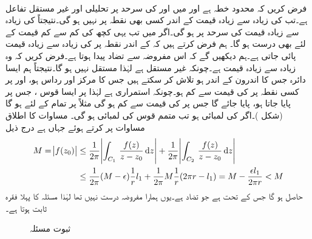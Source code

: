 \quad {}\\
فرض کریں کہ  محدود خطہ ہے اور  میں اور  کی سرحد  پر  تحلیلی اور غیر مستقل  تفاعل ہے۔تب   کی زیادہ سے زیادہ قیمت  کے اندر کسی بھی نقطہ پر نہیں ہو گی۔نتیجتاً  کی زیادہ سے زیادہ قیمت  کی سرحد پر ہو گی۔اگر  میں  تب یہی کچھ  کی کم سے کم قیمت کے لئے بھی درست ہو گا۔
\quad
ہم فرض کرتے ہیں کہ  کے اندر نقطہ  پر  کی زیادہ سے زیادہ قیمت پائی جاتی ہے۔ہم دیکھیں گے کہ اس مفروضہ سے تضاد پیدا ہوتا ہے۔فرض کریں کہ وہ زیادہ سے زیادہ قیمت  ہے۔چونکہ  غیر مستقل ہے لہٰذا  مستقل نہیں ہو گا۔نتیجتاً ہم  ایسا دائرہ  جس کا اندرون  کے اندر  ہو تلاش کر سکتے ہیں جس کا مرکز  اور رداس  ہو، اور  پر کسی نقطہ  پر  کی قیمت  سے کم ہو۔چونکہ  استمراری ہے لہٰذا   پر ایسا قوس ، جس پر  پایا جاتا ہو، پایا جائے گا جس پر  کی قیمت  سے کم ہو گی مثلاً  پر تمام  کے لئے  ہو گا (شکل )۔اگر  کی لمبائی  ہو تب متمم قوس  کی لمبائی  ہو گی۔ مساوات  کا اطلاق مساوات  پر کرتے ہوئے جہاں  ہے درج ذیل
\begin{align*}
M=\abs{f(z_0)}&\le \frac{1}{2\pi} \abs{\int_{C_1}\, \frac{f(z)}{z-z_0}\dif z}+\frac{1}{2\pi}\abs{\int_{C_2}\,\frac{f(z)}{z-z_0}\dif z}\\
&\le \frac{1}{2\pi}(M-\epsilon)\frac{1}{r}l_1+\frac{1}{2\pi} M\frac{1}{r}(2\pi r-l_1)=M-\frac{\epsilon l_1}{2\pi r}<M
\end{align*}
حاصل ہو گا  جس کے تحت  ہے جو تضاد ہے۔یوں ہمارا مفروضہ درست نہیں تھا لہٰذا مسئلہ کا پہلا فقرہ ثابت ہوتا ہے۔
\begin{figure}
\centering
{}
\caption{ثبوت مسئلہ }
\label{شکل_مسئلہ_مخفی_قوہ_بلند_تر_سرحد_پر}
\end{figure} 

